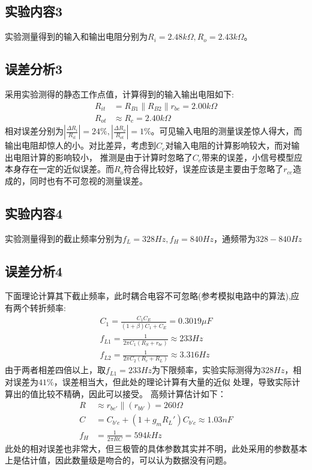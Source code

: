 \documentclass[a4paper,11pt,UTF8]{ctexart}
\begin{document}
  \subsection{实验内容3}
  实验测量得到的输入和输出电阻分别为$R_i=2.48k\Omega,R_o=2.43k\Omega$。
  \subsection{误差分析3}
  采用实验测得的静态工作点值，计算得到的输入输出电阻如下:
  \begin{equation}
    \begin{aligned}
      R_{it}&=R_{B1}\parallel R_{B2}\parallel r_{be}=2.00k\Omega\\
      R_{ot}&\approx R_{c}=2.40k\Omega
    \end{aligned}
  \end{equation}
  相对误差分别为$\left |\frac{\Delta R_{i}}{R_{it}}\right |=24\%,\left |\frac{\Delta R_{o}}{R_{ot}}\right |=1\%$。可见输入电阻的测量误差惊人得大，而输出电阻却惊人的小。对比差异，考虑到$C_e$对输入电阻的计算影响较大，而对输出电阻计算的影响较小，
  推测是由于计算时忽略了$C_e$带来的误差，小信号模型应本身存在一定的近似误差。而$R_{o}$符合得比较好，误差应该是主要由于忽略了$r_{ce}$造成的，同时也有不可忽视的测量误差。
  \subsection{实验内容4}
  实验测量得到的截止频率分别为$f_L=328Hz,f_H=840Hz$，通频带为$328-840Hz$
  \subsection{误差分析4}
  下面理论计算其下截止频率，此时耦合电容不可忽略(参考模拟电路中的算法),应有两个转折频率:
  \begin{equation}
    \begin{aligned}
     C_1=\frac{C_1C_E}{(1+\beta)C_1+C_E}=0.3019\mu F\\
     f_{L1}=\frac{1}{2\pi C_1(R_S+r_{be})}\approx 233Hz\\
     f_{L2}=\frac{1}{2\pi C_2(R_c+R_L)}\approx 3.316Hz
    \end{aligned}
  \end{equation}
  由于两者相差四倍以上，取$f_{L1}=233Hz$为下限频率，实验实际测得为$328Hz$，相对误差为$41\%$，误差相当大，但此处的理论计算有大量的近似
  处理，导致实际计算出的值比较不精确，因此可以接受。
  高频计算估计如下：
  \begin{equation}
    \begin{aligned}
      R&\approx r_{be'}\parallel(r_{bb'})=260\Omega\\
      C&=C_{b'e}+(1+g_m R_L')C_{b'c}\approx 1.03 nF\\
      f_H&=\frac{1}{2\pi RC}=594kHz
    \end{aligned}
  \end{equation}
  此处的相对误差也非常大，但三极管的具体参数其实并不明，此处采用的参数基本上是估计值，因此数量级是吻合的，可以认为数据没有问题。
\end{document}
